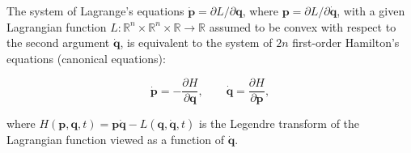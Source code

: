 The system of Lagrange's equations $\dot{\mathbf{p}} = \partial L / \partial \mathbf{q}$, where $\mathbf{p} = \partial L / \partial \dot{\mathbf{q}}$, with a given Lagrangian function $L: \mathbb{R}^n \times \mathbb{R}^n \times \mathbb{R} \to \mathbb{R}$ assumed to be convex with respect to the second argument $\dot{\mathbf{q}}$, is equivalent to the system of $2n$ first-order Hamilton's equations (canonical equations):

$$\dot{\mathbf{p}} = -\frac{\partial H}{\partial \mathbf{q}}, \qquad \dot{\mathbf{q}} = \frac{\partial H}{\partial \mathbf{p}},$$

where $H(\mathbf{p}, \mathbf{q}, t) = \mathbf{p} \dot{\mathbf{q}} - L(\mathbf{q}, \dot{\mathbf{q}}, t)$ is the Legendre transform of the Lagrangian function viewed as a function of $\dot{\mathbf{q}}$.
